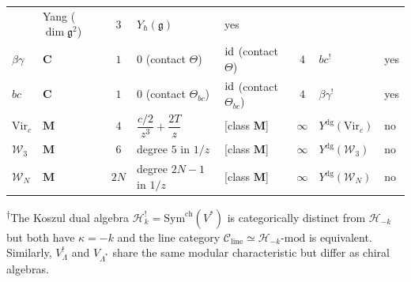 \begin{theorem}
\begin{center}
\begin{tabular}{llcllcll}
 & Yang ($\dim\mathfrak{g}^2$)
 & $3$
 & $Y_\hbar(\mathfrak{g})$
 & yes \\[3pt]
$\beta\gamma$
 & $\mathbf{C}$ & $1$
 & $0$ \textup{(contact $\Theta$)}
 & $\mathrm{id}$ \textup{(contact $\Theta$)}
 & $4$
 & $bc^!$
 & yes \\[3pt]
$bc$
 & $\mathbf{C}$ & $1$
 & $0$ \textup{(contact $\Theta_{bc}$)}
 & $\mathrm{id}$ \textup{(contact $\Theta_{bc}$)}
 & $4$
 & $\beta\gamma^!$
 & yes \\[3pt]
$\mathrm{Vir}_c$
 & $\mathbf{M}$ & $4$
 & $\dfrac{c/2}{z^3} + \dfrac{2T}{z}$
 & \textup{[class $\mathbf{M}$]}
 & $\infty$
 & $Y^{\mathrm{dg}}(\mathrm{Vir}_c)$
 & no \\[6pt]
$\mathcal{W}_3$
 & $\mathbf{M}$ & $6$
 & degree $5$ in $1/z$
 & \textup{[class $\mathbf{M}$]}
 & $\infty$
 & $Y^{\mathrm{dg}}(\mathcal{W}_3)$
 & no \\[3pt]
$\mathcal{W}_N$
 & $\mathbf{M}$ & $2N$
 & degree $2N{-}1$ in $1/z$
 & \textup{[class $\mathbf{M}$]}
 & $\infty$
 & $Y^{\mathrm{dg}}(\mathcal{W}_N)$
 & no \\
\bottomrule
\end{tabular}
\end{center}

\smallskip
\noindent
\textsuperscript{$\dagger$}The Koszul dual algebra $\mathcal{H}_k^!
= \mathrm{Sym}^{\mathrm{ch}}(V^*)$ is categorically distinct from
$\mathcal{H}_{-k}$ but
both have $\kappa = -k$ and the line category
$\mathcal{C}_{\mathrm{line}} \simeq
\mathcal{H}_{-k}\text{-}\mathrm{mod}$
is equivalent. Similarly, $V_\Lambda^!$ and $V_{\Lambda^*}$ share
the same modular characteristic but differ as chiral algebras.
\end{theorem}


